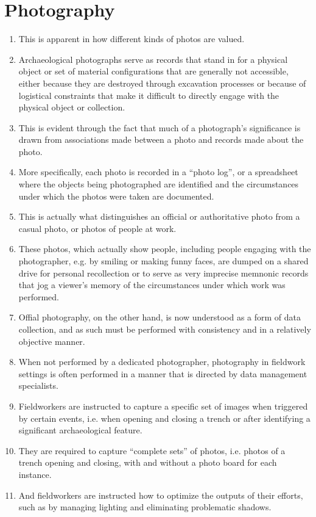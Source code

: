 \documentclass[12pt]{article}
\begin{document}
\section{Photography}
\begin{enumerate}
  \item This is apparent in how different kinds of photos are valued.
  \item Archaeological photographs serve as records that stand in for a physical object or set of material configurations that are generally not accessible, either because they are destroyed through excavation processes or because of logistical constraints that make it difficult to directly engage with the physical object or collection.
  \item This is evident through the fact that much of a photograph’s significance is drawn from associations made between a photo and records made about the photo.
  \item More specifically, each photo is recorded in a ``photo log'', or a spreadsheet where the objects being photographed are identified and the circumstances under which the photos were taken are documented.
  \item This is actually what distinguishes an official or authoritative photo from a casual photo, or photos of people at work.
  \item These photos, which actually show people, including people engaging with the photographer, e.g. by smiling or making funny faces, are dumped on a shared drive for personal recollection or to serve as very imprecise memnonic records that jog a viewer's memory of the circumstances under which work was performed.
  \item Offial photography, on the other hand, is now understood as a form of data collection, and as such must be performed with consistency and in a relatively objective manner.
  \item When not performed by a dedicated photographer, photography in fieldwork settings is often performed in a manner that is directed by data management specialists.
  \item Fieldworkers are instructed to capture a specific set of images when triggered by certain events, i.e. when opening and closing a trench or after identifying a significant archaeological feature.
  \item They are required to capture ``complete sets'' of photos, i.e. photos of a trench opening and closing, with and without a photo board for each instance.
  \item And fieldworkers are instructed how to optimize the outputs of their efforts, such as by managing lighting and eliminating problematic shadows.

\end{enumerate}
\end{document}
